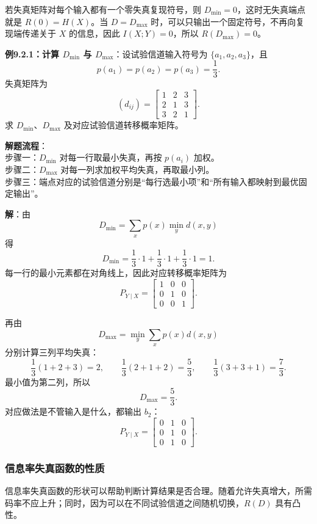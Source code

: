 若失真矩阵对每个输入都有一个零失真复现符号，则 $D_{\min}=0$，这时无失真端点就是 $R(0)=H(X)$。当 $D=D_{\max}$ 时，可以只输出一个固定符号，不再向复现端传递关于 $X$ 的信息，因此 $I(X;Y)=0$，所以 $R(D_{\max})=0$。

\begin{example}
\label{ex:ch9-dmin-dmax}
\textbf{例9.2.1：计算 $D_{\min}$ 与 $D_{\max}$}：设试验信道输入符号为 $\{a_1,a_2,a_3\}$，且
\[
p(a_1)=p(a_2)=p(a_3)=\frac13.
\]
失真矩阵为
\[
(d_{ij})=
\begin{bmatrix}
1&2&3\\
2&1&3\\
3&2&1
\end{bmatrix}.
\]
求 $D_{\min}$、$D_{\max}$ 及对应试验信道转移概率矩阵。

\noindent \textbf{解题流程}：\\[2pt]
步骤一：$D_{\min}$ 对每一行取最小失真，再按 $p(a_i)$ 加权。\\
步骤二：$D_{\max}$ 对每一列求加权平均失真，再取最小列。\\
步骤三：端点对应的试验信道分别是“每行选最小项”和“所有输入都映射到最优固定输出”。

\textbf{解}：由
\[
D_{\min}=\sum_x p(x)\min_y d(x,y)
\]
得
\[
D_{\min}=\frac13\cdot1+\frac13\cdot1+\frac13\cdot1=1.
\]
每一行的最小元素都在对角线上，因此对应转移概率矩阵为
\[
P_{Y\mid X}=
\begin{bmatrix}
1&0&0\\
0&1&0\\
0&0&1
\end{bmatrix}.
\]

再由
\[
D_{\max}=\min_y\sum_x p(x)d(x,y)
\]
分别计算三列平均失真：
\[
\frac13(1+2+3)=2,
\qquad
\frac13(2+1+2)=\frac53,
\qquad
\frac13(3+3+1)=\frac73.
\]
最小值为第二列，所以
\[
D_{\max}=\frac53.
\]
对应做法是不管输入是什么，都输出 $b_2$：
\[
P_{Y\mid X}=
\begin{bmatrix}
0&1&0\\
0&1&0\\
0&1&0
\end{bmatrix}.
\]
\end{example}

\subsubsection{信息率失真函数的性质}

信息率失真函数的形状可以帮助判断计算结果是否合理。随着允许失真增大，所需码率不应上升；同时，因为可以在不同试验信道之间随机切换，$R(D)$ 具有凸性。

